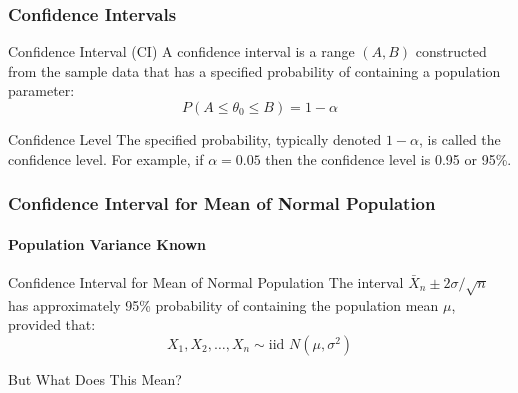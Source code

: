 \documentclass[handout]{beamer}
\begin{document}
\begin{frame}
\frametitle{Confidence Intervals}

\begin{block}{Confidence Interval (CI)}
A confidence interval is a range $(A,B)$ constructed from the \alert{sample data} that has a specified probability of containing a \alert{population parameter}:
	$$P(A \leq \theta_0 \leq B) = 1-\alpha$$
\end{block} 

\pause

\begin{block}{Confidence Level}
The \alert{specified probability}, typically denoted $1-\alpha$, is called the confidence level. For example, if $\alpha = 0.05$ then the confidence level is 0.95 or 95\%.
\end{block}
\end{frame}

\begin{frame}
\frametitle{Confidence Interval for Mean of Normal Population}
\framesubtitle{Population Variance Known}


\begin{block}{Confidence Interval for Mean of Normal Population}
	The interval \alert{$\boxed{\bar{X}_n \pm 2 \sigma/\sqrt{n}}$} has approximately 95\% probability of containing the population mean $\mu$, provided that:
		$$\boxed{X_1, X_2, \hdots, X_n\sim \mbox{iid } N(\mu,\sigma^2)}$$
\end{block}

\pause

\begin{alertblock}{But What Does This Mean?}
\end{alertblock}

\end{frame}
\end{document}

